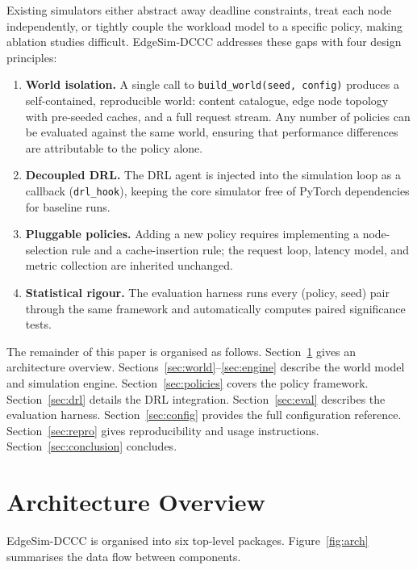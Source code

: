 \documentclass[12pt]{article}
\begin{document}
Existing simulators either abstract away deadline constraints, treat each node independently, or tightly couple the workload model to a specific policy, making ablation studies difficult. EdgeSim-DCCC addresses these gaps with four design principles:

\begin{enumerate}[noitemsep]
  \item \textbf{World isolation.} A single call to \texttt{build\_world(seed, config)} produces a self-contained, reproducible world: content catalogue, edge node topology with pre-seeded caches, and a full request stream. Any number of policies can be evaluated against the same world, ensuring that performance differences are attributable to the policy alone.
  \item \textbf{Decoupled DRL.} The DRL agent is injected into the simulation loop as a callback (\texttt{drl\_hook}), keeping the core simulator free of PyTorch dependencies for baseline runs.
  \item \textbf{Pluggable policies.} Adding a new policy requires implementing a node-selection rule and a cache-insertion rule; the request loop, latency model, and metric collection are inherited unchanged.
  \item \textbf{Statistical rigour.} The evaluation harness runs every (policy, seed) pair through the same framework and automatically computes paired significance tests.
\end{enumerate}

The remainder of this paper is organised as follows. Section~\ref{sec:arch} gives an architecture overview. Sections~\ref{sec:world}--\ref{sec:engine} describe the world model and simulation engine. Section~\ref{sec:policies} covers the policy framework. Section~\ref{sec:drl} details the DRL integration. Section~\ref{sec:eval} describes the evaluation harness. Section~\ref{sec:config} provides the full configuration reference. Section~\ref{sec:repro} gives reproducibility and usage instructions. Section~\ref{sec:conclusion} concludes.

\section{Architecture Overview}
\label{sec:arch}

EdgeSim-DCCC is organised into six top-level packages. Figure~\ref{fig:arch} summarises the data flow between components.
\end{document}

